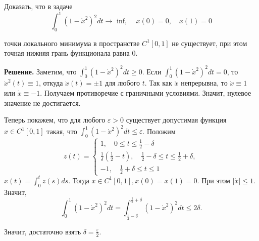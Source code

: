 \begin{task}
    Доказать, что в задаче
    $$
    \int_0^1\left(1-\dot{x}^2\right)^2 d t \rightarrow \text { inf, } \quad x(0)=0, \quad x(1)=0
    $$
    
    точки локального минимума в пространстве $C^1[0,1]$ не существует, при этом точная нижняя грань функционала равна 0.
    
    \textbf{Решение.} Заметим, что $\int_0^1\left(1-\dot{x}^2\right)^2 d t \geqslant 0$. Если $\int_0^1\left(1-\dot{x}^2\right)^2 d t=0$, то $\dot{x}^2(t) \equiv 1$, откуда $\dot{x}(t)= \pm 1$ для любого $t$. Так как $\dot{x}$ непрерывна, то $\dot{x} \equiv 1$ или $\dot{x} \equiv-1$. Получаем противоречие с граничными условиями. Значит, нулевое значение не достигается.
    
    Теперь покажем, что для любого $\varepsilon>0$ существует допустимая функция $x \in C^1[0,1]$ такая, что $\int_0^1\left(1-\dot{x}^2\right)^2 d t \leqslant \varepsilon$. Положим
    $$
    z(t)=\left\{\begin{array}{l}
    1, \quad 0 \leqslant t \leqslant \frac{1}{2}-\delta \\
    \frac{1}{\delta}\left(\frac{1}{2}-t\right), \quad \frac{1}{2}-\delta \leqslant t \leqslant \frac{1}{2}+\delta, \\
    -1, \quad \frac{1}{2}+\delta \leqslant t \leqslant 1
    \end{array}\right.
    $$
    $x(t)=\int_0^t z(s) d s$. Тогда $x \in C^1[0,1], x(0)=x(1)=0$. При этом $|\dot{x}| \leqslant 1$. Значит,
    $$
    \int_0^1\left(1-\dot{x}^2\right)^2 d t=\int_{\frac{1}{2}-\delta}^{\frac{1}{2}+\delta}\left(1-\dot{x}^2\right)^2 d t \leqslant 2 \delta .
    $$
    
    Значит, достаточно взять $\delta=\frac{\varepsilon}{2}$.
    \end{task}